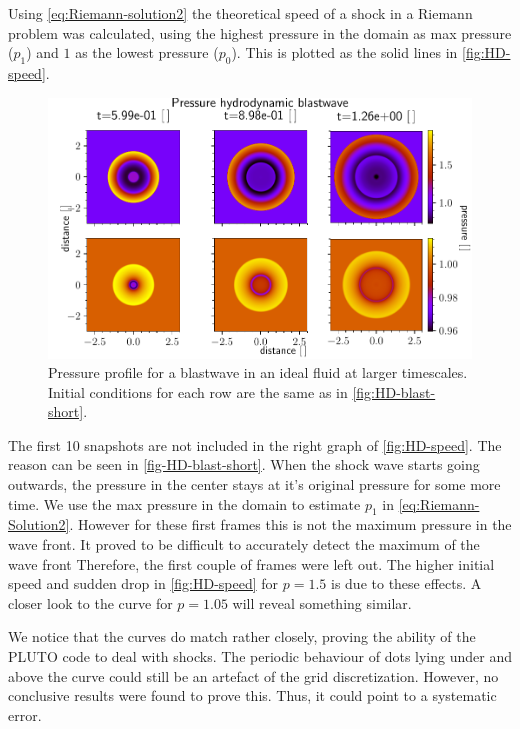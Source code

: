 Using \cref{eq:Riemann-solution2} the theoretical speed of a shock in a Riemann problem was calculated, using the highest pressure in the domain as max pressure ($p_1$) and $1$ as the lowest pressure ($p_0$). This is plotted as the solid lines in \cref{fig:HD-speed}.

\begin{figure}[H]
	\centering
	\includegraphics[width=\linewidth]{images/HD-blast-prs-2.pdf}
	\caption{Pressure profile for a blastwave in an ideal fluid at larger timescales. Initial conditions for each row are the same as in \cref{fig:HD-blast-short}.}
	\label{fig:HD-blast-long}
\end{figure}

The first 10 snapshots are not included in the right graph of \cref{fig:HD-speed}. 
The reason can be seen in \cref{fig-HD-blast-short}. 
When the shock wave starts going outwards, the pressure in the center stays at it's original pressure for some more time.
We use the max pressure in the domain to estimate $p_1$ in \cref{eq:Riemann-Solution2}. However for these first frames this is not the maximum pressure in the wave front.
It proved to be difficult to accurately detect the maximum of the wave front Therefore, the first couple of frames were left out.
The higher initial speed and sudden drop in \cref{fig:HD-speed} for $p=1.5$ is due to these effects. A closer look to the curve for $p=1.05$ will reveal something similar.

We notice that the curves do match rather closely, proving the ability of the PLUTO code to deal with shocks. 
The periodic behaviour of dots lying under and above the curve could still be an artefact of the grid discretization. However, no conclusive results were found to prove this. Thus, it could point to a systematic error.

